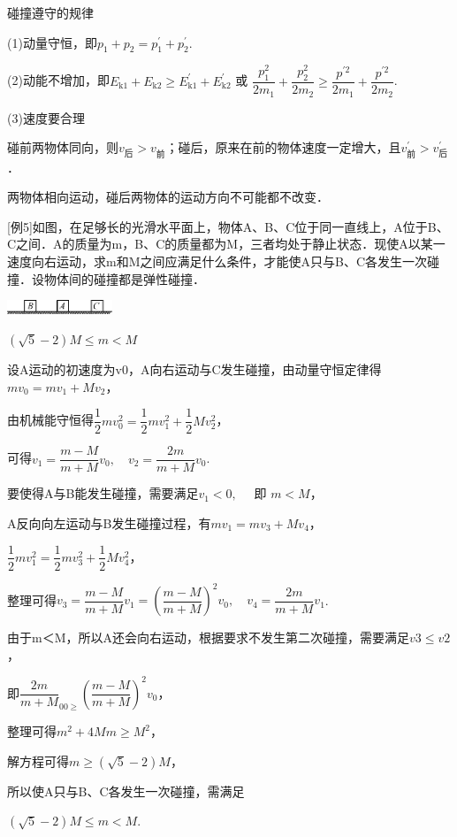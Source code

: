 \documentclass[cn,10.5pt,chinese,mac,chinesefont=founder]{elegantbook}
\begin{document}
碰撞遵守的规律

(1)动量守恒，即$p_{1}+p_{2}=p_{1}^{\prime}+p_{2}^{\prime}$.

(2)动能不增加，即$E_{\mathrm{k} 1}+E_{\mathrm{k} 2} \geq E_{\mathrm{k} 1}^{\prime}+E_{\mathrm{k} 2}^{\prime}$ 或 $\dfrac{p_{1}^{2}}{2 m_{1}}+\dfrac{p_{2}^{2}}{2 m_{2}} \geq \dfrac{p^{\prime 2}}{2 m_{1}}+\dfrac{p^{\prime 2}}{2 m_{2}}$.　

(3)速度要合理

碰前两物体同向，则$v_{\text{后}}>v_{\text{前}}$；碰后，原来在前的物体速度一定增大，且$v_{\text{前}}^\prime>v_{\text{后}}^\prime$．

两物体相向运动，碰后两物体的运动方向不可能都不改变．

{[}例5{]}如图，在足够长的光滑水平面上，物体A、B、C位于同一直线上，A位于B、C之间．A的质量为m，B、C的质量都为M，三者均处于静止状态．现使A以某一速度向右运动，求m和M之间应满足什么条件，才能使A只与B、C各发生一次碰撞．设物体间的碰撞都是弹性碰撞．

\begin{center}\includegraphics[width=1.23611in,height=0.17014in]{media/image252.png}\end{center}
\begin{solution}$(\sqrt{5}-2) M \leq m<M$

	设A运动的初速度为v0，A向右运动与C发生碰撞，由动量守恒定律得$m v_{0}=m v_{1}+M v_{2}$，

由机械能守恒得$\dfrac{1}{2} m v_{0}^{2}=\dfrac{1}{2} m v_{1}^{2}+\dfrac{1}{2} M v_{2}^{2}$，

可得$v_{1}=\dfrac{m-M}{m+M} v_{0}, \quad v_{2}=\dfrac{2 m}{m+M} v_{0}$.

要使得A与B能发生碰撞，需要满足$v_{1}<0, \quad$ 即 $m<M$，

A反向向左运动与B发生碰撞过程，有$m v_{1}=m v_{3}+M v_{4}$，

$\dfrac{1}{2} m v_{1}^{2}=\dfrac{1}{2} m v_{3}^{2}+\dfrac{1}{2} M v_{4}^{2}$，

整理可得$v_{3}=\dfrac{m-M}{m+M} v_{1}=\left(\dfrac{m-M}{m+M}\right)^{2} v_{0}, \quad v_{4}=\dfrac{2 m}{m+M} v_{1}$.

由于m＜M，所以A还会向右运动，根据要求不发生第二次碰撞，需要满足$v3\leq v2$，

即$\dfrac{2 m}{m+M}_{00 \geq}\left(\dfrac{m-M}{m+M}\right)^{2} v_{0}$，

整理可得$m^{2}+4 M m \geq M^{2}$，

解方程可得$m \geq(\sqrt{5}-2) M$，

所以使A只与B、C各发生一次碰撞，需满足

$(\sqrt{5}-2) M \leq m<M$.
\end{solution}
\end{document}
